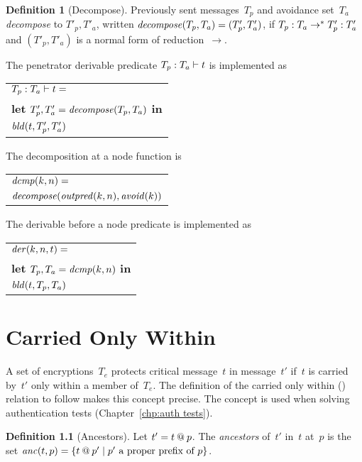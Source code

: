 \documentclass[12pt]{report}
\theoremstyle{definition}
\newtheorem{defn}{Definition}[chapter]
\newcommand{\outpred}{\fn{outpred}}
\newcommand{\avoid}{\fn{avoid}}
\begin{document}
\begin{defn}[Decompose]\label{def:decompose}
Previously sent messages~$T_p$ and avoidance set~$T_a$
\emph{decompose} to $T'_p,T'_a$, written
$\fn{decompose}(T_p,T_a)=(T'_p,T'_a)$, if
$\dctx{T_p}{T_a}\to^\ast\dctx{T'_p}{T'_a}$
and $(T'_p,T'_a)$ is a normal form of reduction~$\to$.
\end{defn}

The penetrator derivable predicate $\der{t}{T_p}{T_a}$ is implemented as
\begin{center}
\begin{tabular}{l}
$\der{t}{T_p}{T_a}={}$\\
\quad\textbf{let} $T'_p, T'_a=\fn{decompose}(T_p,T_a)$ \textbf{in}\\
\quad$\fn{bld}(t,T'_p,T'_a)$
\end{tabular}
\end{center}

The decomposition at a node function is
\begin{center}
\begin{tabular}{l}
$\fn{dcmp}(k,n)={}$\\
\quad$\fn{decompose}(\outpred(k,n),\avoid(k))$
\end{tabular}
\end{center}

The derivable before a node predicate is implemented as
\begin{center}
\begin{tabular}{l}
$\fn{der}(k,n,t)={}$\\
\quad\textbf{let} $T_p, T_a=\fn{dcmp}(k,n)$ \textbf{in}\\
\quad$\fn{bld}(t,T_p,T_a)$
\end{tabular}
\end{center}

\chapter{Carried Only Within}\label{chp:cow}

A set of encryptions~$T_e$ protects critical message~$t$ in
message~$t'$ if~$t$ is carried by~$t'$ only within a member of~$T_e$.
The definition of the carried only within ({\cow}) relation to follow makes
this concept precise.  The concept is used when solving authentication
tests (Chapter~\ref{chp:auth tests}).

\begin{defn}[Ancestors]
Let $t'=t\termat p$.  The \emph{ancestors} of~$t'$
in~$t$ at~$p$ is the set $\fn{anc}(t,p)=\{t\termat p'\mid \mbox{$p'$ a
  proper prefix of~$p$}\}$.
\end{defn}
\end{document}
